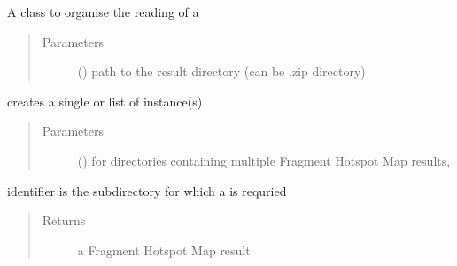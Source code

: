 \documentclass[letterpaper,10pt,english]{sphinxmanual}
\begin{document}
\begin{fulllineitems}
\label{\detokenize{hs_io_api:hotspots.hs_io.HotspotReader}}
A class to organise the reading of a 
\begin{quote}\begin{description}
\item[{Parameters}] \leavevmode
{} () \textendash{} path to the result directory (can be .zip directory)

\end{description}\end{quote}

\begin{fulllineitems}
\label{\detokenize{hs_io_api:hotspots.hs_io.HotspotReader.read}}
creates a single or list of  instance(s)
\begin{quote}\begin{description}
\item[{Parameters}] \leavevmode
{} () \textendash{} for directories containing multiple Fragment Hotspot Map results,

\end{description}\end{quote}

identifier is the subdirectory for which a  is requried
\begin{quote}\begin{description}
\item[{Returns}] \leavevmode
{} a Fragment Hotspot Map result

\end{description}\end{quote}

\begin{sphinxVerbatim}[commandchars=\\\{\}]
   
\end{sphinxVerbatim}


\end{fulllineitems}
\end{fulllineitems}
\end{document}
